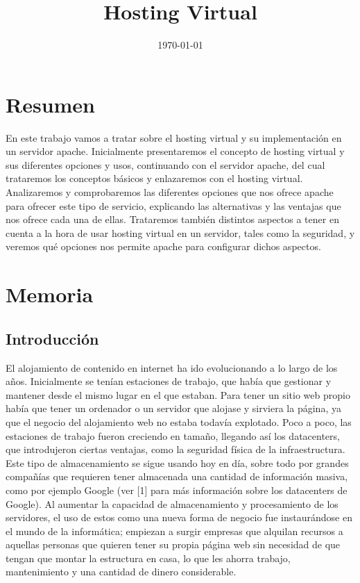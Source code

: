 \documentclass[a4paper, 10pt]{article} %
\title{\textbf{Hosting Virtual}} %
\date{\today} %
\begin{document}
\maketitle
\tableofcontents
\pagebreak

\section{Resumen}

En este trabajo vamos a tratar sobre el hosting virtual y su implementación en un servidor apache. Inicialmente presentaremos el concepto de hosting virtual y sus diferentes opciones y usos, continuando con el servidor apache, del cual trataremos los conceptos básicos y enlazaremos con el hosting virtual. Analizaremos y comprobaremos las diferentes opciones que nos ofrece apache para ofrecer este tipo de servicio, explicando las alternativas y las ventajas que nos ofrece cada una de ellas. Trataremos también distintos aspectos a tener en cuenta a la hora de usar hosting virtual en un servidor, tales como la seguridad, y veremos qué opciones nos permite apache para configurar dichos aspectos. 


\section{Memoria}

\subsection{Introducción}

El alojamiento de contenido en internet ha ido evolucionando a lo largo de los años. Inicialmente se tenían estaciones de trabajo, que había que gestionar y mantener desde el mismo lugar en el que estaban. Para tener un sitio web propio había que tener un ordenador o un servidor que alojase y sirviera la página, ya que el negocio del alojamiento web no estaba todavía explotado. Poco a poco, las estaciones de trabajo fueron creciendo en tamaño, llegando así los datacenters, que introdujeron ciertas ventajas, como la seguridad física de la infraestructura. Este tipo de almacenamiento se sigue usando hoy en día, sobre todo por grandes compañías que requieren tener almacenada una cantidad de información masiva, como por ejemplo Google (ver [1] para más información sobre los datacenters de Google). Al aumentar la capacidad de almacenamiento y procesamiento de los servidores, el uso de estos como una nueva forma de negocio fue instaurándose en el mundo de la informática; empiezan a surgir empresas que alquilan recursos a aquellas personas que quieren tener su propia página web sin necesidad de que tengan que montar la estructura en casa, lo que les ahorra trabajo, mantenimiento y una cantidad de dinero considerable. 
\end{document}
